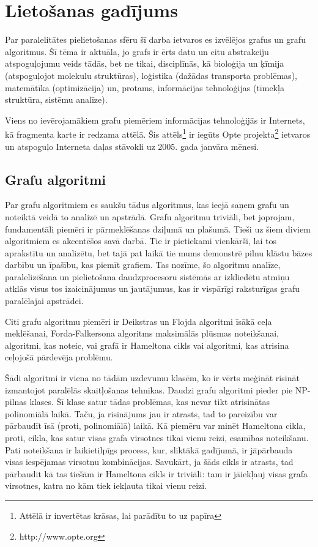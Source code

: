 \section{Lietošanas gadījums}
Par paralelitātes pielietošanas sfēru šī darba ietvaros es izvēlējos grafus un
grafu algoritmus. Šī tēma ir aktuāla, jo grafs ir ērts datu un citu abstrakciju
atspoguļojumu veids tādās, bet ne tikai, disciplīnās, kā bioloģija un ķīmija
(atspoguļojot molekulu struktūras), loģistika (dažādas transporta problēmas),
matemātīka (optimizācija) un, protams, informācijas tehnoloģijas (tīmekļa struktūra,
sistēmu analīze).

Viens no ievērojamākiem grafu piemēriem informācijas tehnoloģijās
ir Internets, kā fragmenta karte ir redzama  attēlā. Šis
attēls\footnote{Attēlā ir invertētas krāsas, lai parādītu to uz papīra}
ir iegūts Opte projekta\footnote{http://www.opte.org} ietvaros un atspoguļo Interneta
daļas stāvokli uz 2005. gada janvāra mēnesi.


\subsection{Grafu algoritmi}
Par grafu algoritmiem es saukšu tādus algoritmus, kas ieejā saņem grafu un noteiktā veidā
to analizē un apstrādā. Grafu algoritmu triviāli, bet joprojam, fundamentāli piemēri
ir pārmeklēšanas dziļumā un plašumā. Tieši uz šiem diviem algoritmiem es akcentēšos
savā darbā. Tie ir pietiekami vienkārši, lai tos aprakstītu un analizētu, bet tajā
pat laikā tie mums demonstrē pilnu klāstu bāzes darbību un īpašību, kas piemīt grafiem.
Tas nozīme, šo algoritmu analīze, paralelizēšana un pielietošana daudzprocesoru
sistēmās ar izkliedētu atmiņu atklās visus tos izaicinājumus un jautājumus, kas ir
vispārīgi raksturīgas grafu paralēlajai apstrādei.

Citi grafu algoritmu piemēri ir Deikstras un Flojda algoritmi īsākā ceļa meklēšanai,
Forda-Falkersona algoritms maksimālās plūsmas noteikšanai, algoritmi, kas noteic,
vai grafā ir Hameltona cikls vai algoritmi, kas atrisina ceļojošā pārdevēja problēmu.

Šādi algoritmi ir viena no tādām uzdevumu klasēm, ko ir vērts meģināt risināt izmantojot
paralēlās skaitļošanas tehnikas. Daudzi grafu algoritmi pieder pie NP-pilnas klases.
Šī klase satur tādas problēmas, kas nevar tikt atrisinātas polinomiālā laikā. Taču, ja
risinājums jau ir atrasts, tad to pareizību var pārbaudīt īsā (proti, polinomiālā)
laikā. Kā piemēru var minēt Hameltona cikla, proti, cikla, kas satur visas grafa
virsotnes tikai vienu reizi, esamības noteikšanu. Pati noteikšana ir laikietilpīgs
process, kur, sliktākā gadījumā, ir jāpārbauda visas iespējamas virsotņu kombinācijas.
Savukārt, ja šāds cikls ir atrasts, tad pārbaudīt kā tas tiešām ir Hameltona cikls
ir triviāli: tam ir jāiekļauj visas grafa virsotnes, katra no kām tiek iekļauta
tikai vienu reizi.

